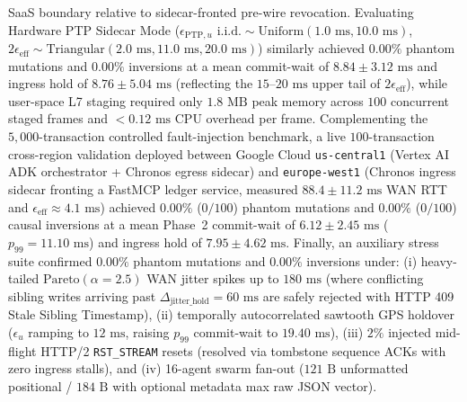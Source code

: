 \documentclass[conference,10pt]{IEEEtran}
\begin{document}
SaaS boundary relative to sidecar-fronted pre-wire revocation. Evaluating Hardware PTP Sidecar Mode ($\epsilon_{\text{PTP},u} \text{ i.i.d.}\sim \text{Uniform}(1.0\text{ ms}, 10.0\text{ ms})$, $2\epsilon_{\text{eff}} \sim \text{Triangular}(2.0\text{ ms}, 11.0\text{ ms}, 20.0\text{ ms})$) similarly achieved $0.00\%$ phantom mutations and $0.00\%$ inversions at a mean commit-wait of $8.84 \pm 3.12\text{ ms}$ and ingress hold of $8.76 \pm 5.04\text{ ms}$ (reflecting the $15\text{--}20\text{ ms}$ upper tail of $2\epsilon_{\text{eff}}$), while user-space L7 staging required only $1.8\text{ MB}$ peak memory across $100$ concurrent staged frames and $<0.12\text{ ms}$ CPU overhead per frame. Complementing the $5{,}000$-transaction controlled fault-injection benchmark, a live $100$-transaction cross-region validation deployed between Google Cloud \texttt{us-central1} (Vertex AI ADK orchestrator + Chronos egress sidecar) and \texttt{europe-west1} (Chronos ingress sidecar fronting a FastMCP ledger service, measured $88.4 \pm 11.2\text{ ms}$ WAN RTT and $\epsilon_{\text{eff}} \approx 4.1\text{ ms}$) achieved $0.00\%$ ($0/100$) phantom mutations and $0.00\%$ ($0/100$) causal inversions at a mean Phase~2 commit-wait of $6.12 \pm 2.45\text{ ms}$ ($p_{99} = 11.10\text{ ms}$) and ingress hold of $7.95 \pm 4.62\text{ ms}$. Finally, an auxiliary stress suite confirmed $0.00\%$ phantom mutations and $0.00\%$ inversions under: (i) heavy-tailed $\text{Pareto}(\alpha = 2.5)$ WAN jitter spikes up to $180\text{ ms}$ (where conflicting sibling writes arriving past $\Delta_{\text{jitter\_hold}} = 60\text{ ms}$ are safely rejected with HTTP 409 Stale Sibling Timestamp), (ii) temporally autocorrelated sawtooth GPS holdover ($\epsilon_u$ ramping to $12\text{ ms}$, raising $p_{99}$ commit-wait to $19.40\text{ ms}$), (iii) $2\%$ injected mid-flight HTTP/2 \texttt{RST\_STREAM} resets (resolved via tombstone sequence ACKs with zero ingress stalls), and (iv) 16-agent swarm fan-out ($121\text{ B}$ unformatted positional / $184\text{ B}$ with optional metadata max raw JSON vector).
\end{document}
